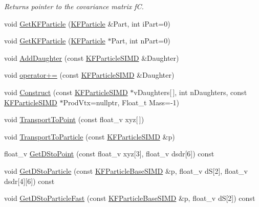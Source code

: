 \begin{DoxyCompactItemize}
\begin{DoxyCompactList}\small\item\em Returns pointer to the covariance matrix fC. \end{DoxyCompactList}\item 
void \hyperlink{classKFParticleSIMD_abee0e1ab2c3a9a40f6618a20fb58f664}{Get\+K\+F\+Particle} (\hyperlink{classKFParticle}{K\+F\+Particle} \&Part, int i\+Part=0)
\item 
void \hyperlink{classKFParticleSIMD_a52e83afab8f9b1d755ae0e1a4e9fdde7}{Get\+K\+F\+Particle} (\hyperlink{classKFParticle}{K\+F\+Particle} $\ast$Part, int n\+Part=0)
\item 
void \hyperlink{classKFParticleSIMD_afd134dee761fd11c9f22c05a0a5262ca}{Add\+Daughter} (const \hyperlink{classKFParticleSIMD}{K\+F\+Particle\+S\+I\+MD} \&Daughter)
\item 
void \hyperlink{classKFParticleSIMD_a7a8fccbeb58437f20fee5cb68e6f1259}{operator+=} (const \hyperlink{classKFParticleSIMD}{K\+F\+Particle\+S\+I\+MD} \&Daughter)
\item 
void \hyperlink{classKFParticleSIMD_a54d024bbcfef5d7f99e1ed7b45973221}{Construct} (const \hyperlink{classKFParticleSIMD}{K\+F\+Particle\+S\+I\+MD} $\ast$v\+Daughters\mbox{[}$\,$\mbox{]}, int n\+Daughters, const \hyperlink{classKFParticleSIMD}{K\+F\+Particle\+S\+I\+MD} $\ast$Prod\+Vtx=nullptr, Float\+\_\+t Mass=-\/1)
\item 
void \hyperlink{classKFParticleSIMD_ac4c896519f2acc22953b5b943bc8e08a}{Transport\+To\+Point} (const float\+\_\+v xyz\mbox{[}$\,$\mbox{]})
\item 
void \hyperlink{classKFParticleSIMD_a75ee554571b29ef90452c2834bebdb1a}{Transport\+To\+Particle} (const \hyperlink{classKFParticleSIMD}{K\+F\+Particle\+S\+I\+MD} \&p)
\item 
float\+\_\+v \hyperlink{classKFParticleSIMD_adf768a35209bb2f98adf8a12e21a09d4}{Get\+D\+Sto\+Point} (const float\+\_\+v xyz\mbox{[}3\mbox{]}, float\+\_\+v dsdr\mbox{[}6\mbox{]}) const 
\item 
void \hyperlink{classKFParticleSIMD_ad8379c5666e84d5c1de7dd1428234744}{Get\+D\+Sto\+Particle} (const \hyperlink{classKFParticleBaseSIMD}{K\+F\+Particle\+Base\+S\+I\+MD} \&p, float\+\_\+v dS\mbox{[}2\mbox{]}, float\+\_\+v dsdr\mbox{[}4\mbox{]}\mbox{[}6\mbox{]}) const 
\item 
void \hyperlink{classKFParticleSIMD_ac4bcc9cda90e1454fd9ab18bfd7bd012}{Get\+D\+Sto\+Particle\+Fast} (const \hyperlink{classKFParticleBaseSIMD}{K\+F\+Particle\+Base\+S\+I\+MD} \&p, float\+\_\+v dS\mbox{[}2\mbox{]}) const 

\end{DoxyCompactItemize}
